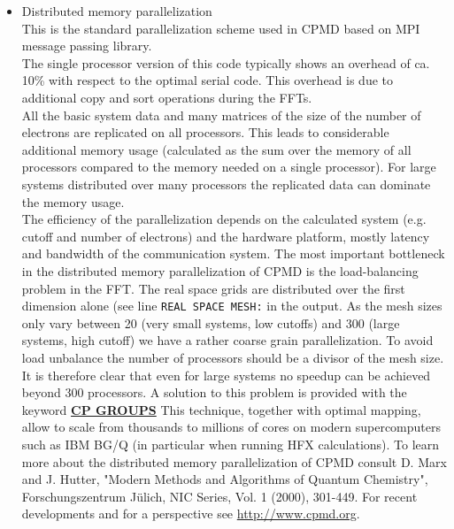 \documentclass[twoside,10pt,titlepage,a4paper]{article}
\makeatletter
\newcommand{\referto}[2]{\hyperlink{#1}{#2}}
\newcommand{\referto}[2]{\htmlref{#2}{#1}}
\newcommand{\htref}[2]{\href{#1}{#2}}
\newcommand{\htref}[2]{\htmladdnormallink{#2}{#1}}
\newcommand{\refspekeyword}[2]{%
\referto{#2}{\textbf{#1}}%
\index{#2@#1}%
}%
\makeatother
\begin{document}
\begin{itemize}
   \item Distributed memory parallelization\\[8pt]
         This is the standard parallelization scheme used in CPMD
         based on MPI message passing library.\\
         The single processor version of this code typically
         shows an overhead of ca. 10\% with respect to the optimal
         serial code. This overhead is due to additional copy and
         sort operations during the FFTs.\\
         All the basic system data and many matrices of the size
         of the number of electrons are replicated on all
         processors. This leads to considerable additional memory
         usage (calculated as the sum over the memory of all
         processors compared to the memory needed on a single
         processor). For large systems distributed over many
         processors the replicated data can dominate the memory usage.\\
         The efficiency of the parallelization depends on the
         calculated system (e.g. cutoff and number of electrons) and
         the hardware platform, mostly latency and bandwidth of the
         communication system. The most important bottleneck in the
         distributed memory parallelization of CPMD is the
         load-balancing problem in the FFT. The real space grids
         are distributed over the first dimension alone (see line
         {\tt REAL SPACE MESH:} in the output. As the mesh sizes
         only vary between 20 (very small systems, low cutoffs) and
         300 (large systems, high cutoff) we have a rather coarse grain
         parallelization. To avoid load unbalance the number of processors
         should be a divisor of the mesh size. It is therefore clear that even
         for large systems no speedup can be achieved beyond 300 processors.
         A solution to this problem is provided with the keyword
         \refspekeyword{CP GROUPS}. This technique, together with optimal mapping,
         allow to scale from thousands to millions of cores on modern
         supercomputers such as IBM BG/Q (in particular when running HFX calculations).  To learn more about the
         distributed memory parallelization of CPMD consult
         D. Marx and J. Hutter, "Modern Methods and Algorithms of Quantum Chemistry",
         Forschungszentrum J\"ulich, NIC Series, Vol. 1 (2000), 301-449.
         For recent developments and for a perspective see \htref{http://www.cpmd.org}{http://www.cpmd.org}.


\end{itemize}
\end{document}
